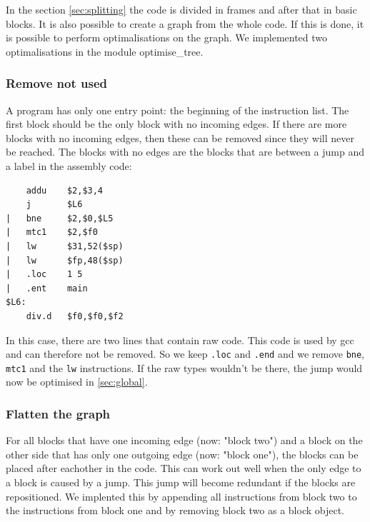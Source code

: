 In the section \ref{sec:splitting} the code is divided in frames and after
that in basic blocks. It is also possible to create a graph from the whole code.
If this is done, it is possible to perform optimalisations on the graph. We 
implemented two optimalisations in the module optimise\_tree.
\subsubsection{Remove not used}
A program has only one entry point: the beginning of the instruction list. The 
first block should be the only block with no incoming edges. If there are more
blocks with no incoming edges, then these can be removed since they will never 
be reached. The blocks with no edges are the blocks that are between a jump
and a label in the assembly code:
\begin{lstlisting}
    addu    $2,$3,4
    j       $L6
|   bne     $2,$0,$L5
|   mtc1    $2,$f0
|   lw      $31,52($sp)
|   lw      $fp,48($sp)
|   .loc    1 5
|   .ent    main        
$L6:
    div.d   $f0,$f0,$f2	
\end{lstlisting}
In this case, there are two lines that contain raw code. This code is used by
gcc and can therefore not be removed. So we keep \texttt{.loc} and \texttt{.end} 
and we remove \texttt{bne}, \texttt{mtc1} and the \texttt{lw} instructions. If
the raw types wouldn't be there, the jump would now be optimised in 
\ref{sec:global}.
\subsubsection{Flatten the graph}
For all blocks that have one incoming edge (now: "block two") and a block on the 
other side that has only one outgoing edge (now: "block one"), the blocks can 
be placed after eachother in the code. This can work out well when the only 
edge to a block is caused by a jump. This jump will become redundant if the 
blocks are repositioned. We implented this by appending all instructions from 
block two to the instructions from block one and by removing block two as a 
block object. 
